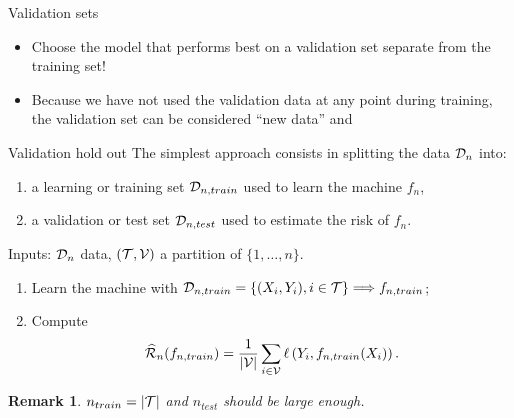 \documentclass[xcolor={usenames,dvipsnames},handout]{beamer}
\newtheorem{remark}[theorem]{Remark}
\begin{document}
 \begin{frame}{Validation sets}
 \begin{itemize}
 \item Choose the model that performs best on a validation set separate from the training set!
 \begin{figure}
 \begin{center}
 \end{center}
 \end{figure}
 \item Because we have not used the validation data at any point during training, the validation set can be considered “new data” and 
 \end{itemize}
 \end{frame}
 \begin{frame}{Validation hold out}
 The simplest approach consists in splitting the data ${\mathcal{D}}_n$ into:
 \begin{enumerate}
 \item a learning or training set ${\mathcal{D}}_{n,train}$ used to learn the machine $f_n$,
\item a validation or test set ${\mathcal{D}}_{n,test}$ used to estimate the risk of $f_n$.
\end{enumerate}

\begin{algorithm}[H]
Inputs: ${\mathcal{D}}_n$ data, $({\mathcal{T}},{\mathcal{V}})$ a partition of $\{1,\hdots , n\}$.
\begin{enumerate}
\item Learn the machine with ${\mathcal{D}}_{n,train} = \{ (X_i,Y_i), i \in {\mathcal{T}}\} \Longrightarrow f_{n,train}$;
\item Compute 
$$
\widehat{{\mathcal{R}}}_n (f_{n,train}) = \frac{1}{|{\mathcal{V}}|} \sum_{i\in {\mathcal{V}}} \ell \left( Y_i, f_{n,train}(X_i)\right).
$$
\end{enumerate}
\caption{Validation hold out}
\end{algorithm}

\begin{remark}
$n_{train} = |{\mathcal{T}}|$ and $n_{test}$ should be large enough.
\end{remark}
\end{frame}


%
%
%
%
%
\end{document}
